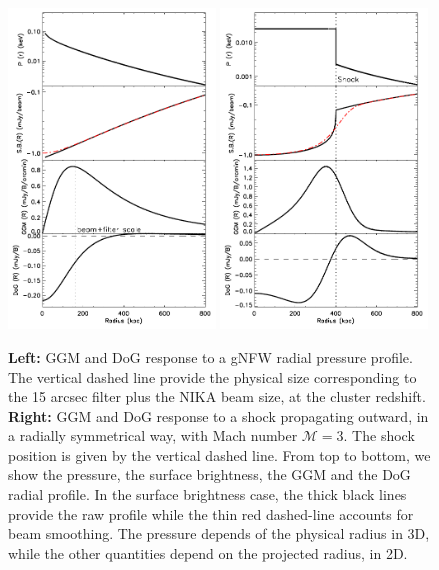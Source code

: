 \documentclass[twocolumn,traditabstract]{aa}
\begin{document}
\begin{figure}[h]
\centering
\includegraphics[trim=0cm 0cm 0cm 0cm, clip=true, width=0.49\textwidth]{Figure/Profiles_gNFW_15_15_45.pdf}
\includegraphics[trim=0cm 0cm 0cm 0cm, clip=true, width=0.49\textwidth]{Figure/Profiles_shock_15_15_45.pdf}
\caption{\footnotesize{{\bf Left:} GGM and DoG response to a gNFW radial pressure profile. The vertical dashed line provide the physical size corresponding to the 15 arcsec filter plus the NIKA beam size, at the cluster redshift. 
{\bf Right:} GGM and DoG response to a shock propagating outward, in a radially symmetrical way, with Mach number $\mathcal{M} = 3$. The shock position is given by the vertical dashed line. 
From top to bottom, we show the pressure, the surface brightness, the GGM and the DoG radial profile. In the surface brightness case, the thick black lines provide the raw profile while the thin red dashed-line accounts for beam smoothing. The pressure depends of the physical radius in 3D, while the other quantities depend on the projected radius, in 2D.}}
\label{fig:test_filter_GNFW_and_shock}
\end{figure}
\end{document}
